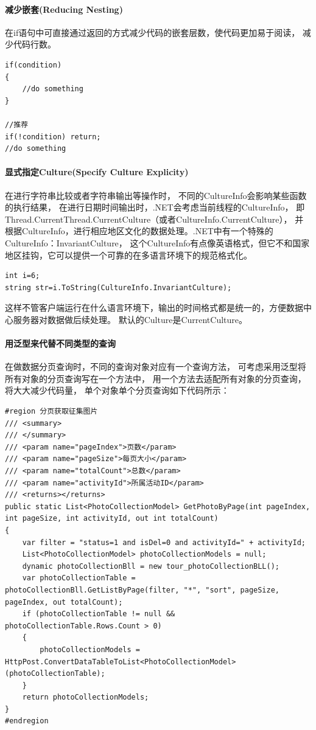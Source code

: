 \documentclass{book}
\begin{document}
\paragraph{减少嵌套(Reducing Nesting)}

在if语句中可直接通过返回的方式减少代码的嵌套层数，使代码更加易于阅读，
减少代码行数。

\begin{lstlisting}[language={[Sharp]C}]
if(condition)
{
	//do something
}

//推荐
if(!condition) return;
//do something
\end{lstlisting}

\paragraph{显式指定Culture(Specify Culture Explicity)}

在进行字符串比较或者字符串输出等操作时，
不同的CultureInfo会影响某些函数的执行结果，
在进行日期时间输出时，.NET会考虑当前线程的CultureInfo，
即Thread.CurrentThread.CurrentCulture（或者CultureInfo.CurrentCulture），
并根据CultureInfo，进行相应地区文化的数据处理。.NET中有一个特殊的CultureInfo：InvariantCulture，
这个CultureInfo有点像英语格式，但它不和国家地区挂钩，它可以提供一个可靠的在多语言环境下的规范格式化。

\begin{lstlisting}[language={[Sharp]C}]
int i=6;
string str=i.ToString(CultureInfo.InvariantCulture);
\end{lstlisting}

这样不管客户端运行在什么语言环境下，输出的时间格式都是统一的，方便数据中心服务器对数据做后续处理。
默认的Culture是CurrentCulture。

\paragraph{用泛型来代替不同类型的查询}在做数据分页查询时，不同的查询对象对应有一个查询方法，
可考虑采用泛型将所有对象的分页查询写在一个方法中，
用一个方法去适配所有对象的分页查询，将大大减少代码量，
单个对象单个分页查询如下代码所示：

\begin{lstlisting}[language={[Sharp]C},caption=单个对象分页查询]
#region 分页获取征集图片
/// <summary>
/// </summary>
/// <param name="pageIndex">页数</param>
/// <param name="pageSize">每页大小</param>
/// <param name="totalCount">总数</param>
/// <param name="activityId">所属活动ID</param>
/// <returns></returns>
public static List<PhotoCollectionModel> GetPhotoByPage(int pageIndex, int pageSize, int activityId, out int totalCount)
{
    var filter = "status=1 and isDel=0 and activityId=" + activityId;
    List<PhotoCollectionModel> photoCollectionModels = null;
    dynamic photoCollectionBll = new tour_photoCollectionBLL();
    var photoCollectionTable = photoCollectionBll.GetListByPage(filter, "*", "sort", pageSize, pageIndex, out totalCount);
    if (photoCollectionTable != null && photoCollectionTable.Rows.Count > 0)
    {
        photoCollectionModels = HttpPost.ConvertDataTableToList<PhotoCollectionModel>(photoCollectionTable);
    }
    return photoCollectionModels;
}
#endregion
\end{lstlisting}
\end{document}
